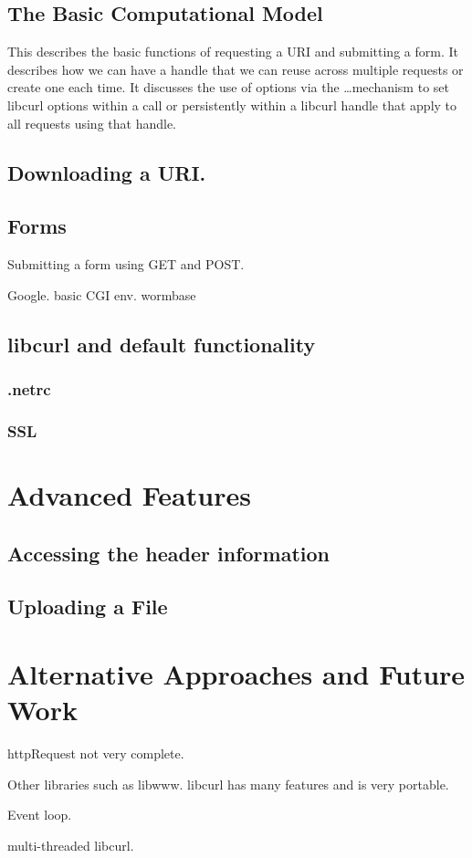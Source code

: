 \documentclass{article}
\begin{document}
\subsection{The Basic Computational Model}

This describes the basic functions of requesting a URI and submitting
a form.  It describes how we can have a handle that we can reuse
across multiple requests or create one each time.  It discusses the
use of options via the \ldots mechanism to set libcurl options within
a call or persistently within a libcurl handle that apply to all
requests using that handle.

\subsection{Downloading a URI.}



\subsection{Forms}
Submitting a form using GET and POST.

 Google.
 basic CGI env.
 wormbase


\subsection{libcurl and default functionality}
\subsubsection{.netrc}

\subsubsection{SSL}


\section{Advanced Features}

\subsection{Accessing the header information}

\subsection{Uploading a File}

\section{Alternative Approaches and Future Work}

httpRequest
  not very complete.

Other libraries such as libwww.
  libcurl has many features and is very portable.

Event loop.
  
multi-threaded libcurl.
\end{document}
